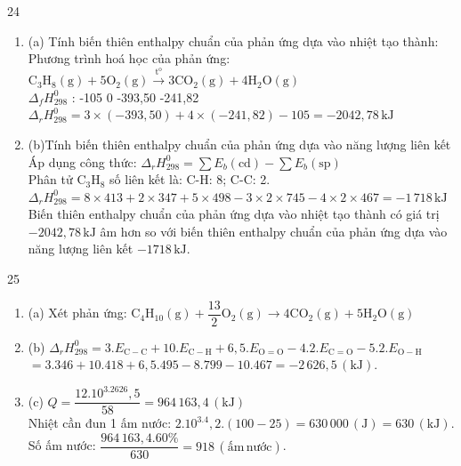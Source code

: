 \def\writeANS{}
\begin{loigiaibth}{24}
  \begin {enumerate} \item (a) Tính biến thiên enthalpy chuẩn của phản ứng dựa vào nhiệt tạo thành: \\ Phương trình hoá học của phản ứng: \\ $\mathrm {C_3H_8(g) + 5O_2(g) \xrightarrow {t^o} 3CO_2(g) + 4H_2O(g)}$ \\ $\Delta _fH_{298}^0$ : \hspace {0.5cm} -105 \hspace {1.5cm} 0 \hspace {1.5cm} -393{,}50 \hspace {1.5cm} -241{,}82 \\ $\Delta _rH_{298}^0 = 3 \times (-393{,}50) + 4 \times (-241{,}82) -105 = -2042{,}78\,\mathrm {kJ}$ \item (b)Tính biến thiên enthalpy chuẩn của phản ứng dựa vào năng lượng liên kết \\ Áp dụng công thức: $\Delta _rH_{298}^0 = \sum E_b (\mathrm {cd}) - \sum E_b (\mathrm {sp})$ \\ Phân tử $\mathrm {C_3H_8}$ số liên kết là: C-H: 8; C-C: 2. \\ $\Delta _rH_{298}^0 = 8 \times 413 + 2 \times 347 + 5 \times 498 - 3 \times 2 \times 745 - 4 \times 2 \times 467 = -1\,718\,\mathrm {kJ}$ \\ Biến thiên enthalpy chuẩn của phản ứng dựa vào nhiệt tạo thành có giá trị $-2042{,}78\,\mathrm {kJ}$ âm hơn so với biến thiên enthalpy chuẩn của phản ứng dựa vào năng lượng liên kết $-1718\,\mathrm {kJ}$. \end {enumerate}
\end{loigiaibth}
\def\writeANS{}
\begin{loigiaibth}{25}
  \begin {enumerate} \item (a) Xét phản ứng: $\mathrm {C_4H_{10}(g) + \dfrac {13}{2}O_2(g) \longrightarrow 4CO_2(g) + 5H_2O(g)}$ \item (b) $\Delta _rH_{298}^0 = 3.E_{\mathrm {C-C}} + 10.E_{\mathrm {C-H}} + 6{,}5.E_{\mathrm {O=O}} - 4.2.E_{\mathrm {C=O}} - 5.2.E_{\mathrm {O-H}}$ \\ $= 3.346 + 10.418 + 6{,}5.495 - 8.799 - 10.467 = - 2\,626{,}5\,\mathrm {(kJ)}$. \item (c) $Q = \dfrac {12.10^3.2626{,}5}{58} = 964\,163{,}4\,\mathrm {(kJ)}$ \\ Nhiệt cần đun 1 ấm nước: $2.10^3.4{,}2.(100 - 25) = 630\,000\,\mathrm {(J)} = 630\,\mathrm {(kJ)}$. \\ Số ấm nước: $\dfrac {964\,163{,}4.60\%}{630} = 918\,\mathrm {(ấm\,nước)}$. \end {enumerate}
\end{loigiaibth}
